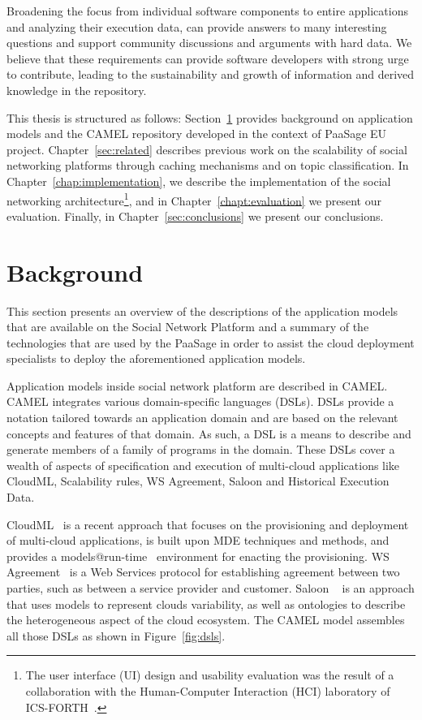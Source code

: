 Broadening the focus from individual software components to entire applications and analyzing their execution data, can provide answers to many interesting questions and support community discussions and arguments with hard data. 
We believe that these requirements can provide software developers with strong urge to contribute, leading to the sustainability and growth of information and derived knowledge in the repository.

This thesis is structured as follows: Section~\ref{sec:background} provides background on application models and the CAMEL repository developed in the context of PaaSage EU project. Chapter~\ref{sec:related} describes previous work on the scalability of social networking platforms through caching mechanisms and on topic classification. In Chapter~\ref{chap:implementation}, we describe the implementation of the social networking architecture\footnote{The user interface (UI) design and usability evaluation was the result of a collaboration with the Human-Computer Interaction (HCI) laboratory of ICS-FORTH~\cite{magoutis2015design}.}, and in Chapter~\ref{chapt:evaluation} we present our evaluation. Finally, in Chapter~\ref{sec:conclusions} we present our conclusions.

\section{Background}
\label{sec:background}
This section presents an overview of the descriptions of the application models that are available on the Social Network Platform and a summary of the technologies that are used by the PaaSage in order to assist the cloud deployment specialists to deploy the aforementioned application models.

Application models inside social network platform are described in CAMEL. CAMEL integrates various domain-specific languages (DSLs).
DSLs provide a notation tailored towards an application domain and are based on the relevant concepts and features of that domain. As such, a DSL is a means to describe and generate members of a family of programs in the domain. 
These DSLs cover a wealth of aspects of specification and execution of multi-cloud applications like CloudML, Scalability rules, WS Agreement, Saloon and Historical Execution Data. 

CloudML~\cite{FerryRossiniCMS13} is a recent approach that focuses on the provisioning and deployment of multi-cloud applications, is built upon MDE techniques and methods, and provides a models@run-time~\cite{models-runtime} environment for enacting the provisioning.  WS Agreement~\cite{andrieux2007web} is a Web Services protocol for establishing agreement between two parties, such as between a service provider and customer. Saloon ~\cite{quinton2013towards} is an approach that uses models to represent clouds variability, as well as ontologies to describe the heterogeneous aspect of the cloud ecosystem. The CAMEL model assembles all those DSLs as shown in Figure~\ref{fig:dsls}.

